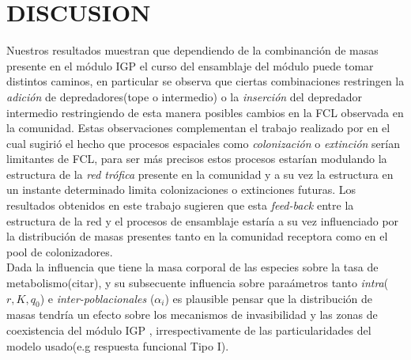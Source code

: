 \section{DISCUSION}


Nuestros resultados muestran que dependiendo de la combinanci\'on de masas presente en el m\'odulo IGP el curso del ensamblaje del m\'odulo puede tomar distintos caminos, en particular se observa que ciertas combinaciones restringen la \emph{adici\'on} de depredadores(tope o intermedio) o la \emph{inserci\'on} del depredador intermedio restringiendo de esta manera posibles cambios en la FCL observada en la comunidad. Estas observaciones complementan el trabajo realizado por \citet{holt2002food} en el cual sugiri\'o el hecho que procesos espaciales como \emph{colonizaci\'on} o \emph{extinci\'on} ser\'ian limitantes de FCL, para ser m\'as precisos estos procesos estar\'ian modulando la estructura de la \emph{red tr\'ofica} presente en la comunidad y a su vez la estructura en un instante determinado limita colonizaciones o extinciones futuras\citep{pawar2009community,holt2002}.  Los resultados obtenidos en este trabajo sugieren que esta \emph{feed-back} entre la estructura de la red y el procesos de ensamblaje estar\'ia a su vez influenciado por la distribuci\'on de masas presentes tanto en la comunidad receptora como en el pool de colonizadores.\\

Dada la influencia que tiene la masa corporal de las especies sobre la tasa de metabolismo(citar), y su subsecuente influencia sobre para\'ametros tanto \emph{intra}($r,K,q_0$)  e \emph{inter-poblacionales} ($\alpha_i$) es plausible pensar que la distribuci\'on de masas tendr\'ia un efecto sobre los mecanismos de invasibilidad y las zonas de coexistencia del m\'odulo IGP , irrespectivamente de las particularidades del modelo usado(e.g respuesta funcional Tipo I). \\

